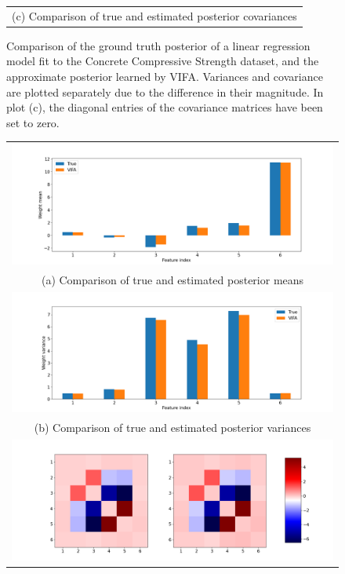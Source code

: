 \documentclass[msc,deptreport.inf]{infthesis} %
\begin{document}
\begin{figure}[!htbp]
\begin{tabular}{c}
		(c) Comparison of true and estimated posterior covariances \\[6pt] 
	\end{tabular}
	\caption{Comparison of the ground truth posterior of a linear regression model fit to the Concrete Compressive Strength dataset, and the approximate posterior learned by VIFA. Variances and covariance are plotted separately due to the difference in their magnitude. In plot (c), the diagonal entries of the covariance matrices have been set to zero.}
	\label{fig:posterior_concrete_strength}
\end{figure} 

\begin{figure}[!htbp] 
	\begin{tabular}{c}
		\includegraphics[width=140mm]{plots/yacht_hydrodynamics_posterior_mean.png} \\
		(a) Comparison of true and estimated posterior means \\[6pt] 
		 \includegraphics[width=140mm]{plots/yacht_hydrodynamics_posterior_variance.png} \\
		(b) Comparison of true and estimated posterior variances \\[6pt] 
		\includegraphics[width=140mm]{plots/yacht_hydrodynamics_posterior_covariance.png} \\

\end{tabular}
\end{figure}
\end{document}
